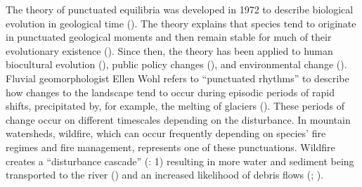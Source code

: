 \documentclass[
]{article}
\begin{document}
The theory of punctuated equilibria was developed in 1972 to describe biological evolution in geological time (). The theory explains that species tend to originate in punctuated geological moments and then remain stable for much of their evolutionary existence (). Since then, the theory has been applied to human biocultural evolution (), public policy changes (), and environmental change (). Fluvial geomorphologist Ellen Wohl refers to ``punctuated rhythms'' to describe how changes to the landscape tend to occur during episodic periods of rapid shifts, precipitated by, for example, the melting of glaciers (). These periods of change occur on different timescales depending on the disturbance. In mountain watersheds, wildfire, which can occur frequently depending on species' fire regimes and fire management, represents one of these punctuations. Wildfire creates a ``disturbance cascade'' (: 1) resulting in more water and sediment being transported to the river () and an increased likelihood of debris flows (; ).
\end{document}
